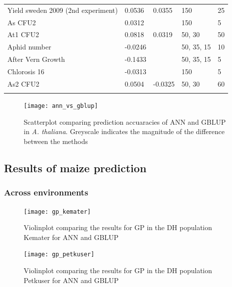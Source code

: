 \begin{longtable}{p{} p{} p{} p{} p{}}
 Yield sweden 2009 (2nd experiment) & 0.0536 & 0.0355 & 150 & 25 \\
 As CFU2 & 0.0312 & \color{red}{0.035} & 150 & 5 \\
 At1 CFU2 & 0.0818 & 0.0319 & 50, 30 & 50 \\
 Aphid number & -0.0246 & \color{red}{0.029} & 50, 35, 15 & 10 \\
 After Vern Growth & -0.1433 & \color{red}{0.0057} & 50, 35, 15 & 5 \\
 Chlorosis 16 & -0.0313 & \color{red}{-0.0121} & 150 & 5 \\
 As2 CFU2 & 0.0504 & -0.0325 & 50, 30 & 60 \\
\bottomrule
\label{tab:at_res}
\end{longtable}
\doublespacing



\begin{figure}[H]
 \centering\texttt{[image:  ann\_vs\_gblup]} \decoRule
\caption[Scatterplot comparing prediction accuaracies of ANN and GBLUP in \textit{A. thaliana}]{Scatterplot comparing prediction accuaracies of ANN and GBLUP in \textit{A. thaliana}. Greyscale indicates the magnitude of the difference between the methods}
\label{fig:annblup}
\end{figure}

\subsection{Results of maize prediction}
\subsubsection{Across environments}

\begin{figure}[H]
 \centering \texttt{[image: gp\_kemater]}
 \decoRule
\caption[Violinplot comparing the results for GP in the DH population Kemater for ANN and GBLUP]{Violinplot comparing the results for GP in the DH population Kemater for ANN and GBLUP }
\label{fig:ke_ann}
\end{figure}

\begin{figure}[H]
 \centering \texttt{[image: gp\_petkuser]}
 \decoRule
 \caption[Violinplot comparing the results for GP in the DH population Petkuser for ANN and GBLUP]{Violinplot comparing the results for GP in the DH population Petkuser for ANN and GBLUP }
\label{fig:pe_ann}
\end{figure}


